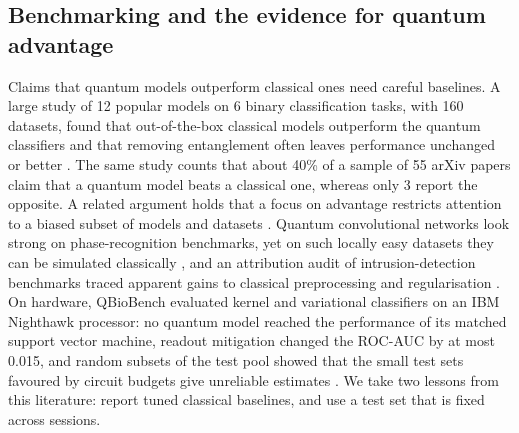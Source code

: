 \documentclass[10pt,conference]{IEEEtran}
\begin{document}
\subsection{Benchmarking and the evidence for quantum advantage}
Claims that quantum models outperform classical ones need careful baselines. A large study of
12 popular models on 6 binary classification tasks, with 160 datasets, found that
out-of-the-box classical models outperform the quantum classifiers and that removing
entanglement often leaves performance unchanged or better \cite{bowles2024benchmarking}. The
same study counts that about 40\% of a sample of 55 arXiv papers claim that a quantum model
beats a classical one, whereas only 3 report the opposite. A related argument holds that a focus
on advantage restricts attention to a biased subset of models and datasets
\cite{schuld2022advantage}. Quantum convolutional networks look strong on phase-recognition
benchmarks, yet on such locally easy datasets they can be simulated classically
\cite{bermejo2026qcnn}, and an attribution audit of intrusion-detection benchmarks traced
apparent gains to classical preprocessing and regularisation \cite{gillani2026nids}. On
hardware, QBioBench evaluated kernel and variational classifiers on an IBM Nighthawk processor:
no quantum model reached the performance of its matched support vector machine, readout
mitigation changed the ROC-AUC by at most 0.015, and random subsets of the test pool showed
that the small test sets favoured by circuit budgets give unreliable estimates
\cite{qbiobench2026}. We take two lessons from this literature: report tuned classical
baselines, and use a test set that is fixed across sessions.
\end{document}
